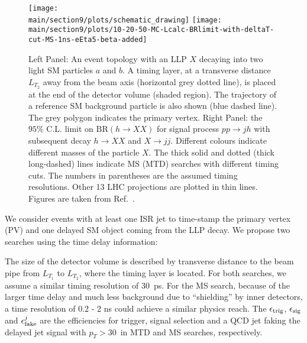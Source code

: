 \begin{figure}[t]
    \centering
    \texttt{[image: \\main/section9/plots/schematic\_drawing]} 
    \texttt{[image: \\main/section9/plots/10-20-50-MC-Lcalc-BRlimit-with-deltaT-cut-MS-1ns-eEta5-beta-added]} 
    \caption{ Left Panel: An event topology with an LLP $X$ decaying into two light SM particles $a$ and $b$. A timing 
    layer, at a transverse distance $L_{T_2}$ away from the beam axis (horizontal grey dotted line), is placed at the end of the detector volume 
    (shaded region). The trajectory of a reference SM background particle is also shown (blue dashed line).
    The grey polygon indicates the primary vertex.
    Right Panel: the $95\%$ C.L. limit on $\text{BR}(h \to XX)$ for signal process $pp \to j h$ with subsequent decay 
    $h\to X X$ and $X \to j j$. Different colours indicate different masses of the particle $X$. 
    The thick solid and dotted (thick long-dashed) lines indicate MS (MTD) searches with different timing cuts. The numbers in parentheses are 
    the assumed timing resolutions. Other 13 \UTeV LHC projections \cite{Coccaro:2016lnz, Bernaciak:2014pna} are plotted in thin lines. Figures are taken from Ref.~\cite{Liu:2018wte}.
    }
    \label{fig:ctaulimitHiggs}
\end{figure}

We consider events with at least one ISR jet to time-stamp the primary vertex (PV) and one delayed SM object coming from the LLP decay. We propose two searches using the time delay information:
\begin{center}
\end{center}
The size of the detector volume is described by transverse distance to the beam pipe from $L_{T_1}$ to $L_{T_2}$, where the timing layer
is located. For both searches, we assume a similar timing resolution of 30~ps.
For the MS search, because of the larger time delay and much less background due to ``shielding'' by inner detectors, 
a time resolution of 0.2 - 2 ns could achieve a similar physics reach. The $\epsilon_{\rm trig}$, 
$\epsilon_{\rm sig}$ and $\epsilon_{\rm fake}^j$ are the efficiencies for trigger, signal selection and a QCD jet faking the delayed jet signal with $p_T>30$~\UGeV in MTD and MS searches, respectively. 

